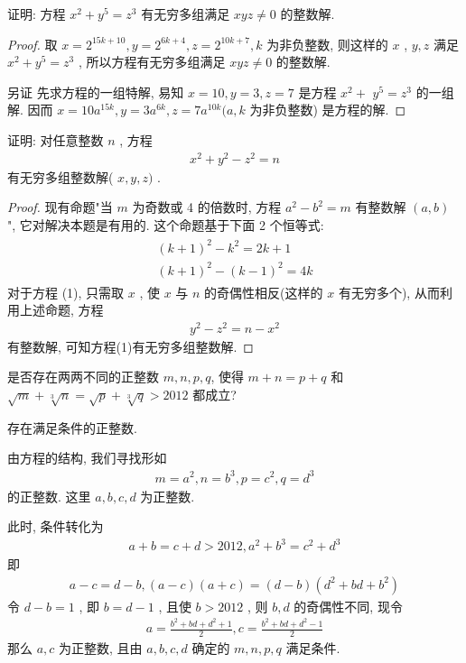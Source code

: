 \begin{example}
	证明: 方程 $x^{2}+y^{5}=z^{3}$ 有无穷多组满足 $x y z \neq 0$ 的整数解.
\end{example}
\begin{proof}
	取 $x=2^{15 k+10}, y=2^{6 k+4}, z=2^{10 k+7}, k$ 为非负整数, 则这样的 $x$ ,  $y ,  z$ 满足 $x^{2}+y^{5}=z^{3}$ , 所以方程有无穷多组满足 $x y z \neq 0$ 的整数解.

	另证 先求方程的一组特解, 易知 $x=10 ,  y=3 ,  z=7$ 是方程 $x^{2}+$ $y^{5}=z^{3}$ 的一组解. 因而 $x=10 a^{15 k}, y=3 a^{6 k}, z=7 a^{10 k}(a, k$ 为非负整数) 是方程的解.
\end{proof}

\begin{example}
	证明: 对任意整数 $n$ , 方程
	\begin{align*}
		x^{2}+y^{2}-z^{2}=n
	\end{align*}
	有无穷多组整数解( $x, y, z)$ .
\end{example}
\begin{proof}
	现有命题"当 $m$ 为奇数或 4 的倍数时, 方程 $a^{2}-b^{2}=m$ 有整数解 $(a, b)$ ", 它对解决本题是有用的. 这个命题基于下面 2 个恒等式:
	\begin{align*}
		\begin{gathered}
			(k+1)^{2}-k^{2}=2 k+1 \\
			(k+1)^{2}-(k-1)^{2}=4 k
		\end{gathered}
	\end{align*}
	对于方程 (1), 只需取 $x$ , 使 $x$ 与 $n$ 的奇偶性相反(这样的 $x$ 有无穷多个), 从而利用上述命题, 方程
	\begin{align*}
		y^{2}-z^{2}=n-x^{2}
	\end{align*}
	有整数解, 可知方程(1)有无穷多组整数解.
\end{proof}

\begin{example}
	是否存在两两不同的正整数 $m ,  n ,  p ,  q$, 使得 $m+n=p+q$ 和 $\sqrt{m}+\sqrt[3]{n}=\sqrt{p}+\sqrt[3]{q}>2012$ 都成立?
\end{example}
\begin{solution}
	存在满足条件的正整数.

	由方程的结构, 我们寻找形如
	\begin{align*}
		m=a^{2}, n=b^{3}, p=c^{2}, q=d^{3}
	\end{align*}
	的正整数. 这里 $a ,  b ,  c ,  d$ 为正整数.

	此时, 条件转化为
	\begin{align*}
		a+b=c+d>2012, a^{2}+b^{3}=c^{2}+d^{3}
	\end{align*}
	即
	\begin{align*}
		a-c=d-b,(a-c)(a+c)=(d-b)\left(d^{2}+b d+b^{2}\right)
	\end{align*}
	令 $d-b=1$ , 即 $b=d-1$ , 且使 $b>2012$ , 则 $b ,  d$ 的奇偶性不同, 现令
	\begin{align*}
		a=\frac{b^{2}+b d+d^{2}+1}{2}, c=\frac{b^{2}+b d+d^{2}-1}{2}
	\end{align*}
	那么 $a ,  c$ 为正整数, 且由 $a ,  b ,  c ,  d$ 确定的 $m ,  n ,  p ,  q$ 满足条件.
\end{solution}

